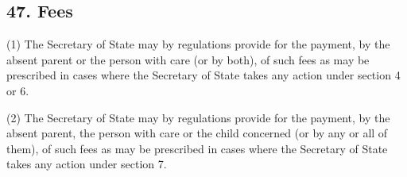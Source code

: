 \documentclass[12pt,a4paper]{article}
\begin{document}
%
%
%
%
%
%
%
%
%
%

\subsection{47. Fees}

(1) The Secretary of State may by regulations provide for the payment, by the absent parent or the person with care (or by both), of such fees as may be prescribed in cases where the Secretary of State takes any action under section 4 or 6.

(2) The Secretary of State may by regulations provide for the payment, by the absent parent, the person with care or the child concerned (or by any or all of them), of such fees as may be prescribed in cases where the Secretary of State takes any action under section 7.
\end{document}
